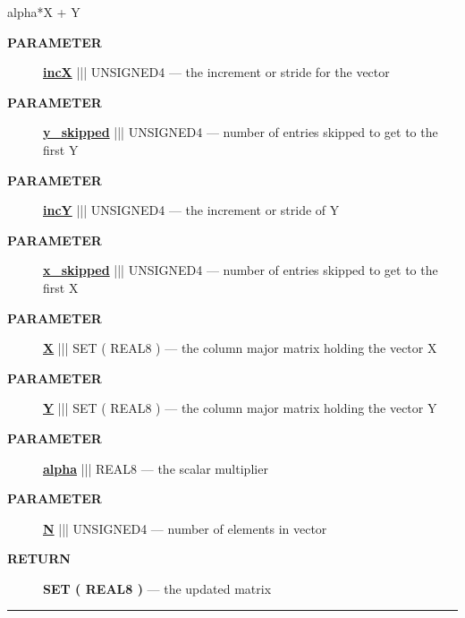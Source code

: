 \par





alpha*X + Y






\par
\begin{description}
\item [\colorbox{tagtype}{\color{white} \textbf{\textsf{PARAMETER}}}] \textbf{\underline{incX}} ||| UNSIGNED4 --- the increment or stride for the vector
\item [\colorbox{tagtype}{\color{white} \textbf{\textsf{PARAMETER}}}] \textbf{\underline{y\_skipped}} ||| UNSIGNED4 --- number of entries skipped to get to the first Y
\item [\colorbox{tagtype}{\color{white} \textbf{\textsf{PARAMETER}}}] \textbf{\underline{incY}} ||| UNSIGNED4 --- the increment or stride of Y
\item [\colorbox{tagtype}{\color{white} \textbf{\textsf{PARAMETER}}}] \textbf{\underline{x\_skipped}} ||| UNSIGNED4 --- number of entries skipped to get to the first X
\item [\colorbox{tagtype}{\color{white} \textbf{\textsf{PARAMETER}}}] \textbf{\underline{X}} ||| SET ( REAL8 ) --- the column major matrix holding the vector X
\item [\colorbox{tagtype}{\color{white} \textbf{\textsf{PARAMETER}}}] \textbf{\underline{Y}} ||| SET ( REAL8 ) --- the column major matrix holding the vector Y
\item [\colorbox{tagtype}{\color{white} \textbf{\textsf{PARAMETER}}}] \textbf{\underline{alpha}} ||| REAL8 --- the scalar multiplier
\item [\colorbox{tagtype}{\color{white} \textbf{\textsf{PARAMETER}}}] \textbf{\underline{N}} ||| UNSIGNED4 --- number of elements in vector
\end{description}







\par
\begin{description}
\item [\colorbox{tagtype}{\color{white} \textbf{\textsf{RETURN}}}] \textbf{SET ( REAL8 )} --- the updated matrix
\end{description}




\rule{\linewidth}{0.5pt}
